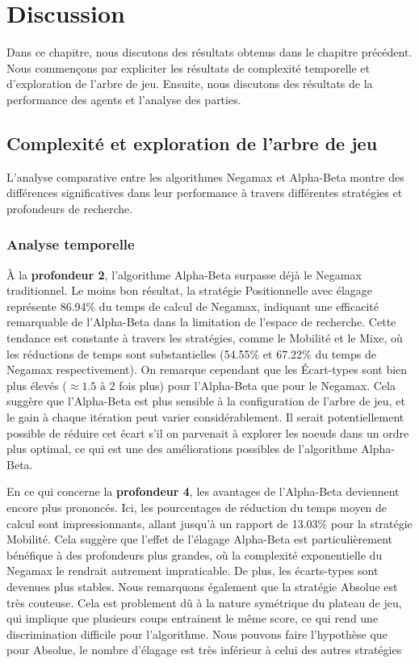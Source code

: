 \chapter{Discussion}
\label{chap:discussion}

Dans ce chapitre, nous discutons des résultats obtenus dans le chapitre précédent. Nous commençons par expliciter les résultats de complexité temporelle et d'exploration de l'arbre de jeu. Ensuite, nous discutons des résultats de la performance des agents et l'analyse des parties.

\section{Complexité et exploration de l'arbre de jeu}
L'analyse comparative entre les algorithmes Negamax et Alpha-Beta montre des différences significatives dans leur performance à travers différentes stratégies et profondeurs de recherche.

\subsection{Analyse temporelle}
À la \textbf{profondeur 2}, l'algorithme Alpha-Beta surpasse déjà le Negamax traditionnel. Le moins bon résultat, la  stratégie Positionnelle avec élagage représente 86.94\% du temps de calcul de Negamax, indiquant une efficacité remarquable de l'Alpha-Beta dans la limitation de l'espace de recherche. Cette tendance est constante à travers les stratégies, comme le Mobilité et le Mixe, où les réductions de temps sont substantielles (54.55\% et 67.22\% du temps de Negamax respectivement). On remarque cependant que les Écart-types sont bien plus élevés ($\approx 1.5 \,\, \text{à} \,\, 2$ fois plus) pour l'Alpha-Beta que pour le Negamax. Cela suggère que l'Alpha-Beta est plus sensible à la configuration de l'arbre de jeu, et le gain à chaque itération peut varier considérablement. Il serait potentiellement possible de réduire cet écart s'il on parvenait à explorer les noeuds dans un ordre plus optimal, ce qui est une des améliorations possibles de l'algorithme Alpha-Beta.

En ce qui concerne la \textbf{profondeur 4}, les avantages de l'Alpha-Beta deviennent encore plus prononcés. Ici, les pourcentages de réduction du temps moyen de calcul sont impressionnants, allant jusqu'à un rapport de 13.03\% pour la stratégie Mobilité. Cela suggère que l'effet de l'élagage Alpha-Beta est particulièrement bénéfique à des profondeurs plus grandes, où la complexité exponentielle du Negamax le rendrait autrement impraticable. De plus, les écarts-types sont devenues plus stables. Nous remarquons également que la stratégie Absolue est très couteuse. Cela est problement dû à la nature symétrique du plateau de jeu, qui implique que plusieurs coups entrainent le même score, ce qui rend une discrimination difficile pour l'algorithme. Nous pouvons faire l'hypothèse que pour Absolue, le nombre d'élagage est très inférieur à celui des autres stratégies

